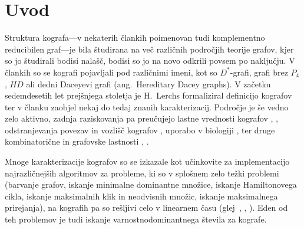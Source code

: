 \documentclass[12pt,a4paper,twoside]{article}
\theoremstyle{definition} %
\theoremstyle{plain} %
\numberwithin{equation}{section}  %
\begin{document}
\section{Uvod}
Struktura kografa---v nekaterih člankih poimenovan tudi komplementno reducibilen graf---je bila študirana na več različnih področjih teorije grafov, kjer so jo študirali bodisi nalašč, bodisi so jo na novo odkrili povsem po naključju. V člankih so se kografi pojavljali pod različnimi imeni, kot so $D^*$-grafi, grafi brez $P_4$, $HD$ ali dedni Daceyevi grafi (ang.~Hereditary Dacey graphs). V začetku sedemdesetih let prejšnjega stoletja je H.~Lerchs formaliziral definicijo kografov ter v članku \cite{corneil1981complement} zaobjel nekaj do tedaj znanih karakterizacij. Področje je še vedno zelo aktivno, zadnja raziskovanja pa preučujejo lastne vrednosti kografov \cite{allem2020integral}, \cite{ghorbani2019cographs}, odstranjevanja povezav in vozlišč kografov \cite{tsur2020faster}, uporabo v biologiji \cite{geiss2020reciprocal}, \cite{hellmuth2013orthology} ter druge kombinatorične in grafovske lastnosti \cite{brevsar2015cographs}, \cite{epple2020k}.

Mnoge karakterizacije kografov so se izkazale kot učinkovite za implementacijo najrazličnejših algoritmov za probleme, ki so v splošnem zelo težki problemi (barvanje grafov, iskanje minimalne dominantne množice, iskanje Hamiltonovega cikla, iskanje maksimalnih klik in neodvisnih množic, iskanje maksimalnega prirejanja), na kografih pa so rešljivi celo v linearnem času (glej~\cite{corneil1984clustering}, \cite{corneil1984cographs}, \cite{yu1993n}). Eden od teh problemov je tudi iskanje varnostnodominantnega števila za kografe.
\end{document}
